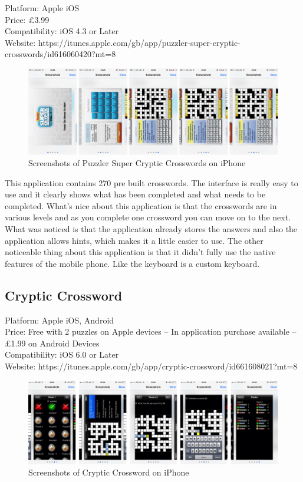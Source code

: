 Platform: Apple iOS \\ 
Price: \pounds3.99 \\ 
Compatibility: iOS 4.3 or Later \\
Website: https://itunes.apple.com/gb/app/puzzler-super-cryptic-crosswords/id616060420?mt=8

\begin{figure}[H]
  \centering
  \includegraphics[width=\linewidth]{pscs.png}
  \caption{Screenshots of Puzzler Super Cryptic Crosswords on iPhone}
\end{figure}

This application contains 270 pre built crosswords. The interface is really easy
to use and it clearly shows what has been completed and what needs to be
completed. What's nice about this application is that the crosswords are in
various levels and as you complete one crossword you can move on to the next.
What was noticed is that the application already stores the answers and also the
application allows hints, which makes it a little easier to use. The other
noticeable thing about this application is that it didn't fully use the native
features of the mobile phone. Like the keyboard is a custom keyboard.


\subsection{Cryptic Crossword}

Platform: Apple iOS, Android \\ 
Price: Free with 2 puzzles on Apple devices 
        -- In application purchase available 
        -- \pounds1.99 on Android Devices \\ 
Compatibility: iOS 6.0 or Later \\ 
Website: https://itunes.apple.com/gb/app/cryptic-crossword/id661608021?mt=8


\begin{figure}[H]
  \centering
  \includegraphics[width=\linewidth]{cc.png}
  \caption{Screenshots of Cryptic Crossword on iPhone}
\end{figure}

